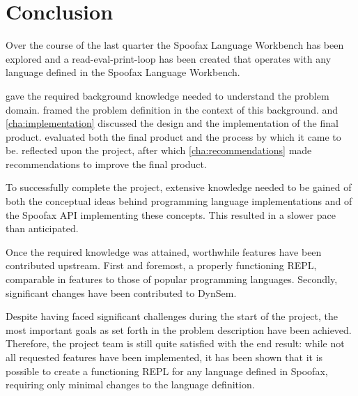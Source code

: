 \chapter{Conclusion}
\label{cha:conclusion}

Over the course of the last quarter the Spoofax Language Workbench has been
explored and a read-eval-print-loop has been created that operates with any
language defined in the Spoofax Language Workbench.

 gave the required background knowledge needed to
understand the problem domain.  framed the problem
definition in the context of this background.  and
\cref{cha:implementation} discussed the design and the implementation of the
final product.  evaluated both the final product and the
process by which it came to be.  reflected upon the
project, after which \cref{cha:recommendations} made recommendations to improve
the final product.

To successfully complete the project, extensive knowledge needed to be gained of both the conceptual
ideas behind programming language implementations and of the Spoofax API
implementing these concepts. This resulted in a slower pace than anticipated.

Once the required knowledge was attained, worthwhile features have been
contributed upstream. First and foremost, a properly functioning REPL,
comparable in features to those of popular programming languages. Secondly,
significant changes have been contributed to DynSem.

Despite having faced significant challenges during the start of the project,
the most important goals as set forth in the problem description have been
achieved. Therefore, the project team is still quite satisfied with the end
result: while not all requested features have been implemented, it has been shown
that it is possible to create a functioning REPL for any language defined in
Spoofax, requiring only minimal changes to the language definition.

